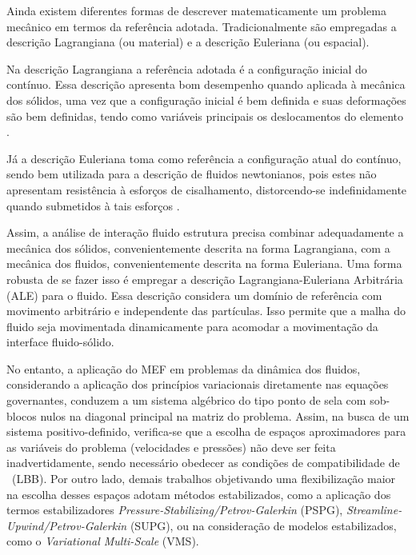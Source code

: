 Ainda existem diferentes formas de descrever matematicamente um problema mecânico em termos da referência adotada. Tradicionalmente são empregadas a descrição Lagrangiana (ou material) e a descrição Euleriana (ou espacial).

Na descrição Lagrangiana a referência adotada é a configuração inicial do contínuo. Essa descrição apresenta bom desempenho quando aplicada à mecânica dos sólidos, uma vez que a configuração inicial é bem definida e suas deformações são bem definidas, tendo como variáveis principais os deslocamentos do elemento \cite{sanches2014fluid, fernandes2019ale}.

Já a descrição Euleriana toma como referência a configuração atual do contínuo, sendo bem utilizada para a descrição de fluidos newtonianos, pois estes não apresentam resistência à esforços de cisalhamento, distorcendo-se indefinidamente quando submetidos à tais esforços \cite{sanches2014fluid, fernandes2019ale}.

Assim, a análise de interação fluido estrutura precisa combinar adequadamente a mecânica dos sólidos, convenientemente descrita na forma Lagrangiana, com a mecânica dos fluidos, convenientemente descrita na forma Euleriana. Uma forma robusta de se fazer isso é empregar a descrição Lagrangiana-Euleriana Arbitrária (ALE)  \cite{donea1982arbitrary} para o fluido. Essa descrição considera um domínio de referência com movimento arbitrário e independente das partículas. Isso permite que a malha do fluido seja movimentada dinamicamente para acomodar a movimentação da interface fluido-sólido.

No entanto, a aplicação do MEF em problemas da dinâmica dos fluidos, considerando a aplicação dos princípios variacionais diretamente nas equações governantes, conduzem a um sistema algébrico do tipo ponto de sela com sob-blocos nulos na diagonal principal na matriz do problema. Assim, na busca de um sistema positivo-definido, verifica-se que a escolha de espaços aproximadores para as variáveis do problema (velocidades e pressões) não deve ser feita inadvertidamente, sendo necessário obedecer as condições de compatibilidade de \LBB\ (LBB). Por outro lado, demais trabalhos objetivando uma flexibilização maior na escolha desses espaços adotam métodos estabilizados, como a aplicação dos termos estabilizadores \textit{Pressure-Stabilizing/Petrov-Galerkin} (PSPG), \textit{Streamline-Upwind/Petrov-Galerkin} (SUPG), ou na consideração de modelos estabilizados, como o \textit{Variational Multi-Scale} (VMS).

